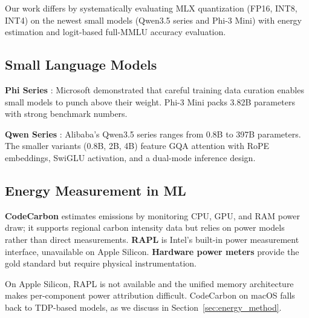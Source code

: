 \documentclass[journal]{IEEEtran}
\begin{document}
Our work differs by systematically evaluating MLX quantization (FP16, INT8, INT4) on the newest small models (Qwen3.5 series and Phi-3 Mini) with energy estimation and logit-based full-MMLU accuracy evaluation.

\subsection{Small Language Models}

\textbf{Phi Series} \cite{javaheripi2023phi2, abdin2024phi3}: Microsoft demonstrated that careful training data curation enables small models to punch above their weight. Phi-3 Mini packs 3.82B parameters with strong benchmark numbers.

\textbf{Qwen Series} \cite{qwen2025technical}: Alibaba's Qwen3.5 series ranges from 0.8B to 397B parameters. The smaller variants (0.8B, 2B, 4B) feature GQA attention with RoPE embeddings, SwiGLU activation, and a dual-mode inference design.

\subsection{Energy Measurement in ML}

\textbf{CodeCarbon} \cite{codecarbon2023} estimates emissions by monitoring CPU, GPU, and RAM power draw; it supports regional carbon intensity data but relies on power models rather than direct measurements. \textbf{RAPL} \cite{david2010rapl} is Intel's built-in power measurement interface, unavailable on Apple Silicon. \textbf{Hardware power meters} \cite{conti2023multiport} provide the gold standard but require physical instrumentation.

On Apple Silicon, RAPL is not available and the unified memory architecture makes per-component power attribution difficult. CodeCarbon on macOS falls back to TDP-based models, as we discuss in Section~\ref{sec:energy_method}.
\end{document}

